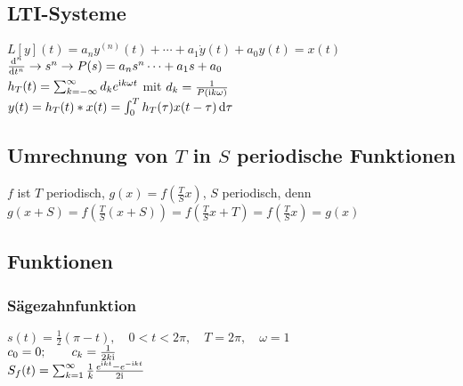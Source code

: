 \documentclass[german,color]{latex4ei/latex4ei_fs}
\begin{document}
\begin{sectionbox}
	\subsection{LTI-Systeme}
	$L[y](t) = a_n y^{(n)}(t) + \cdots + a_1 \dot{y}(t) + a_0 y(t) = x(t)$\\
	$\frac{\diff^n}{\diff t^n} \ra s^n \ra P(s) = a_n s^n \cdots + a_1 s + a_0$\\
	$h_T(t) = \sum_{k=-\infty}^{\infty}d_k e^{\mathrm{i} k \omega t}$ mit $d_k = \frac{1}{P(\mathrm{i} k \omega)}$\\
	$y(t) = h_T(t)*x(t) = \int_0^T h_T(\tau) x(t - \tau) \diff \tau$
\end{sectionbox}

\begin{sectionbox}
	\subsection{Umrechnung von $T$ in $S$ periodische Funktionen}
	$f$ ist $T$ periodisch, $g(x) = f\left( \frac{T}{S} x \right)$, $S$ periodisch, denn
	$g(x+S) = f\left( \frac{T}{S} (x+S) \right) = f\left( \frac{T}{S} x + T \right) = f\left( \frac{T}{S} x \right) = g(x)$\\
\end{sectionbox}

\begin{sectionbox}
	\subsection{Funktionen}
	\subsubsection{Sägezahnfunktion}
	$s(t) = \frac{1}{2}(\pi - t), \quad 0 < t < 2 \pi, \quad T = 2 \pi, \quad \omega = 1$\\
	$c_0 = 0; \qquad c_k = \frac{1}{2k \mathrm{i}}$\\
	$S_f(t) = \sum_{k=1}^{\infty}\frac{1}{k}\frac{e^{\mathrm{i} k t} - e^{-\mathrm{i} k t}}{2 \mathrm{i}}$
\end{sectionbox}


\end{document}
